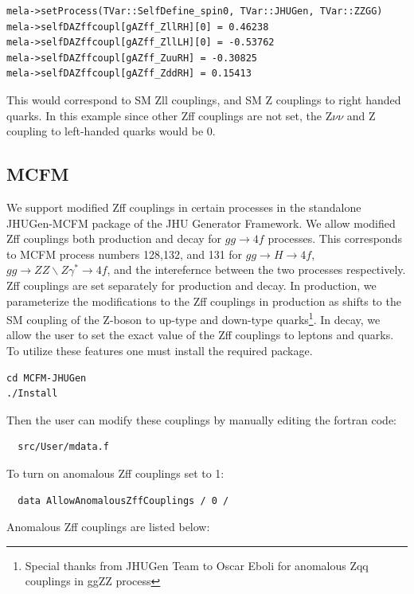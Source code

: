 \documentclass[aps,superscriptaddress,nofootinbib]{revtex4}
\begin{document}
\begin{verbatim}
mela->setProcess(TVar::SelfDefine_spin0, TVar::JHUGen, TVar::ZZGG)
mela->selfDAZffcoupl[gAZff_ZllRH][0] = 0.46238
mela->selfDAZffcoupl[gAZff_ZllLH][0] = -0.53762
mela->selfDAZffcoupl[gAZff_ZuuRH] = -0.30825
mela->selfDAZffcoupl[gAZff_ZddRH] = 0.15413
\end{verbatim}
This would correspond to SM Zll couplings, and SM Z couplings to right handed quarks. In this example since other Zff couplings are not set, the 
Z$\nu\nu$ and Z coupling to left-handed quarks would be 0. 

\subsection{MCFM}
We support modified Zff couplings in certain processes in the standalone JHUGen-MCFM package of the JHU Generator Framework. We allow modified Zff couplings both production and decay for $gg \to 4f$ processes. This corresponds to MCFM 
process numbers 128,132, and 131 for $gg \to H \to 4f$, $gg \to ZZ\backslash Z\gamma^{\ast} \to 4f $, and the interefernce between the two processes respectively. Zff couplings are set separately for production and decay.
In production, we parameterize the modifications to the Zff couplings in production as shifts to the SM coupling of the Z-boson to up-type and down-type quarks\footnote{Special thanks from JHUGen Team to Oscar Eboli for anomalous Zqq couplings in ggZZ process}. In decay, we allow the user to set the exact value of the Zff couplings to leptons and quarks. To utilize these features one must install the required package.
\begin{verbatim}
cd MCFM-JHUGen
./Install
\end{verbatim}
Then the user can modify these couplings by manually editing the fortran code:
\begin{verbatim}
  src/User/mdata.f
\end{verbatim}
To turn on anomalous Zff couplings set to 1:
\begin{verbatim}
  data AllowAnomalousZffCouplings / 0 /
\end{verbatim}
Anomalous Zff couplings are listed below:
\end{document}
